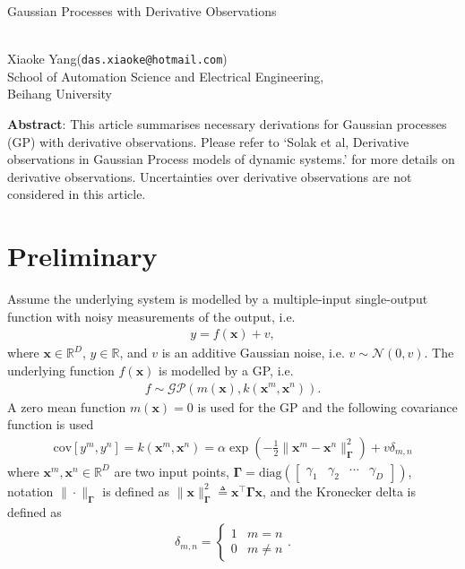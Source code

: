 \documentclass[10pt,oneside,a4paper,notitlepage]{article}
\newcommand{\vect}[1]{\mathbf{#1}}
\begin{document}
\begin{center}
\begin{Large}
Gaussian Processes with Derivative Observations
\end{Large}
\\
\vspace{4mm}
Xiaoke Yang\hspace{1em}(\texttt{das.xiaoke@hotmail.com}) \\
School of Automation Science and Electrical Engineering, \\
Beihang University
\end{center}
\vspace{4mm}
\textbf{Abstract}: This article summarises necessary derivations for Gaussian processes (GP) with derivative observations. Please refer to `Solak et al, Derivative observations in Gaussian Process models of dynamic systems.' for more details on derivative observations. Uncertainties over derivative observations are not considered in this article. 

\section{Preliminary}
Assume the underlying system is modelled by a multiple-input single-output function with noisy measurements of the output, i.e.
\begin{align}
y = f(\vect x) + v,
\end{align}
where $\vect x\in\mathbb R^D$, $y\in\mathbb R$, and $v$ is an additive Gaussian noise, i.e. $v\sim\mathcal N(0, v)$. The underlying function $f(\vect x)$ is modelled by a GP, i.e. 
\begin{align}
f\sim\mathcal{GP}(m(\vect x), k(\vect x^m, \vect x^n)).
\end{align}
A zero mean function $m(\vect x) = 0$ is used for the GP and the following covariance function is used
\begin{align}
\label{eq:kxx}
\mathrm{cov}[y^m, y^n] = k(\vect x^m, \vect x^n) = \alpha\exp\left(-\frac{1}{2}\|\vect x^m - \vect x^n\|_{\boldsymbol{\Gamma}}^2\right) + v\delta_{m,n}
\end{align}
where $\vect x^m, \vect x^n\in\mathbb R^D$ are two input points, $\boldsymbol{\Gamma} = \mathrm{diag}\left(\begin{bmatrix}\gamma_1&\gamma_2&\cdots&\gamma_D\end{bmatrix}\right)$, notation $\|\cdot\|_{\boldsymbol\Gamma}$ is defined as $\|\vect x\|^2_{\boldsymbol{\Gamma}} \triangleq \vect x^\top \boldsymbol\Gamma \vect x $, and the Kronecker delta is defined as
\begin{align}
\delta_{m,n}=\left\{\begin{matrix}1 & m=n\\ 0 & m\neq n\end{matrix}\right. .
\end{align}
\end{document}
